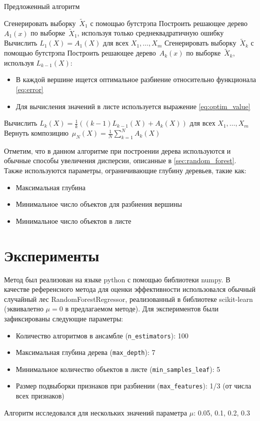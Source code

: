 \documentclass{article}
\begin{document}
\begin{algorithm}[H]
\caption{Предложенный алгоритм}
    \begin{algorithmic}[1]
      \STATE Сгенерировать выборку~$\tilde X_1$ с помощью бутстрэпа
      \STATE Построить решающее дерево~$A_1(x)$ по выборке~$\tilde X_1$, используя только среднеквадратичную ошибку
      \STATE Вычислить $L_1(X) = A_1(X)$ для всех $X_1, \dots, X_m$
            \STATE Сгенерировать выборку~$\tilde X_k$ с помощью бутстрэпа
            \STATE Построить решающее дерево~$A_k(x)$ по выборке~$\tilde X_k$, используя $L_{k-1}(X)$:
                \begin{itemize}
                    \item В каждой вершине ищется оптимальное разбиение относительно функционала \eqref{eq:error}
                    \item Для вычисления значений в листе используется выражение \eqref{eq:optim_value}
                \end{itemize}
              
            \STATE Вычислить $L_{k}(X) = \frac{1}{k} ((k-1)L_{k-1}(X) + A_k(X))$ для всех $X_1, \dots, X_m$
        \ENDFOR
        \STATE Вернуть композицию~$\mu_N(X) = \frac{1}{N} \sum_{k = 1}^{N} A_k(X)$
    \end{algorithmic}
\end{algorithm}

Отметим, что в данном алгоритме при построении дерева используются и обычные способы увеличения дисперсии, описанные в \autoref{sec:random_forest}. Также используются параметры, ограничивающие глубину деревьев, такие как:
\begin{itemize}
  \item Максимальная глубина
  \item Минимальное число объектов для разбиения вершины
  \item Минимальное число объектов в листе
\end{itemize}

\section{Эксперименты}
Метод был реализован на языке python с помощью библиотеки numpy. В качестве референсного метода для оценки эффективности использовался обычный случайный лес RandomForestRegressor, реализованный в библиотеке  scikit-learn \cite{scikit-learn} (эквивалетно $\mu = 0$ в предлагаемом методе). Для экспериментов были зафиксированы следующие параметры:
\begin{itemize}
  \item Количество алгоритмов в ансамбле (\lstinline|n_estimators|): 100
  \item Максимальная глубина дерева (\lstinline|max_depth|): 7
  \item Минимальное количество объектов в листе (\lstinline|min_samples_leaf|): 5
  \item Размер подвыборки признаков при разбиении (\lstinline|max_features|): 1/3 (от числа всех признаков)
\end{itemize}
Алгоритм исследовался для нескольких значений параметра $\mu$: 0.05, 0.1, 0.2, 0.3
\end{document}
